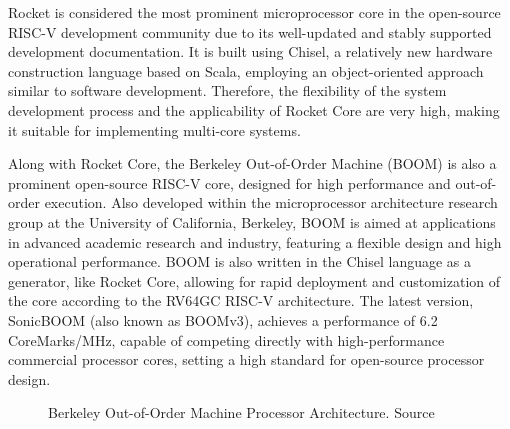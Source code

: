 Rocket is considered the most prominent microprocessor core in the open-source RISC-V development community due to its well-updated and stably supported development documentation. It is built using Chisel, a relatively new hardware construction language based on Scala, employing an object-oriented approach similar to software development. Therefore, the flexibility of the system development process and the applicability of Rocket Core are very high, making it suitable for implementing multi-core systems.

Along with Rocket Core, the Berkeley Out-of-Order Machine (BOOM) \cite{celio2015boom, celio2016boom_spec} is also a prominent open-source RISC-V core, designed for high performance and out-of-order execution. Also developed within the microprocessor architecture research group at the University of California, Berkeley, BOOM is aimed at applications in advanced academic research and industry, featuring a flexible design and high operational performance. BOOM is also written in the Chisel language as a generator, like Rocket Core, allowing for rapid deployment and customization of the core according to the RV64GC RISC-V architecture. The latest version, SonicBOOM \cite{zhao2020sonicboom} (also known as BOOMv3), achieves a performance of 6.2 CoreMarks/MHz, capable of competing directly with high-performance commercial processor cores, setting a high standard for open-source processor design.

\begin{figure}[h!]
    \centering
    \caption{Berkeley Out-of-Order Machine Processor Architecture. Source \cite{celio2015boom}}
    \label{fig:boom_architecture}
\end{figure}

